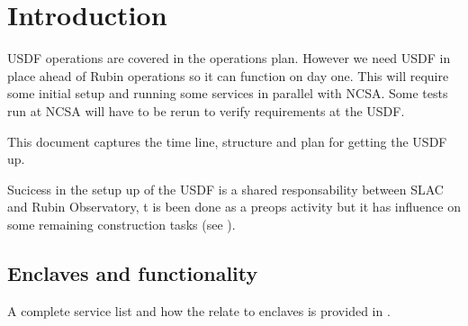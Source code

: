 \section{Introduction}
USDF operations are covered in the operations plan.
However we need \gls{USDF} in place ahead of Rubin  operations so it can function on day one.
This will require some initial setup and running some services in parallel with \gls{NCSA}.
Some tests  run at NCSA will have to be rerun to verify requirements at the \gls{USDF}.

This document captures the time line, structure and plan for getting the \gls{USDF} up.

Sucicess in the setup up of the \gls{USDF} is a shared responsability between SLAC and Rubin Observatory,
t is been done as a preops activity but it has influence on some remaining construction tasks (see ).

\subsection{Enclaves and functionality}\label{sec:enclaves}

A complete service list  and how the relate to enclaves is provided in .
